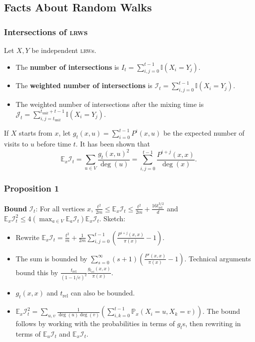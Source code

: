 \documentclass{beamer}
\newcommand{\ind}{\mathbb{I}}
\newcommand{\E}{\mathbb{E}}
\newcommand{\Prob}{\mathbb{P}}
\begin{document}
\subsection{Facts About Random Walks}
\begin{frame}
\frametitle{Intersections of \textsc{lrw}s}
Let $X,Y$ be independent \textsc{lrw}s. 
\begin{itemize}
    \item The \textbf{number of intersections} is $I_t=\sum_{i,j=0}^{t-1} \ind(X_i=Y_j)$. 
    \item The \textbf{weighted number of intersections} is $\mathcal{I}_t=\sum_{i,j=0}^{t-1} \ind(X_i=Y_j)$. \item The weighted number of intersections after the mixing time is $\mathcal{J}_t=\sum_{i,j=t_{\text{unif}}}^{t_{\text{unif}}+t-1} \ind(X_i=Y_j)$.
\end{itemize}
If $X$ starts from $x$, let $g_t(x,u)=\sum_{i=0}^{t-1} P^i(x,u)$ be the expected number of visits to $u$ before time $t$. It has been shown that 
\[\E_x\mathcal{I}_t = \sum_{u\in V}\frac{g_t(x,u)^2}{\deg(u)}=\sum_{i,j=0}^{t-1} \frac{P^{i+j}(x,x)}{\deg(x)}.\]
\end{frame}

\begin{frame}
\frametitle{Proposition 1}
\textbf{Bound} $\mathcal{I}_t$: For all vertices $x$, $\frac{t^2}{2m}\leq \E_x\mathcal{I}_t\leq \frac{t^2}{2m}+\frac{16t_{\text{rel}}^{3/2}}{d}$ and $\E_x\mathcal{I}_t^2\leq 4\left(\max_{a\in V} \E_a\mathcal{I}_t\right)\E_x \mathcal{I}_t$. Sketch:
\begin{itemize}
    \item Rewrite $\E_x\mathcal{I}_t=\frac{t^2}{m}+\frac{1}{2m}\sum_{i,j=0}^{t-1}\left(\frac{P^{i+j}(x,x)}{\pi(x)}-1\right)$.
    \item The sum is bounded by $\sum_{s=0}^\infty (s+1)\left(\frac{P^s(x,x)}{\pi(x)}-1\right)$. Technical arguments bound this by $\frac{t_{\text{rel}}}{(1-1/e)^2} \frac{g_{t_{\text{rel}}}(x,x)}{\pi(x)}$. 
    \item $g_t(x,x)$ and $t_{\text{rel}}$ can also be bounded.
    \item $\E_x\mathcal{I}_t^2=\sum_{u,v} \frac{1}{\deg(u)\deg(v)}\left(\sum_{i,k=0}^{t-1}\Prob_x(X_i=u,X_k=v)\right)$. The bound follows by working with the probabilities in terms of $g_t$s, then rewriting in terms of $\E_u\mathcal{I}_t$ and $\E_x\mathcal{I}_t$.
\end{itemize}

\end{frame}
\end{document}
